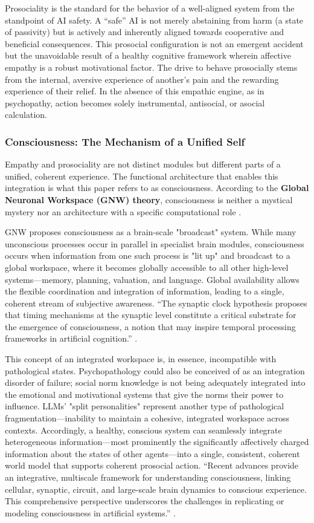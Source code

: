 \documentclass{article}
\begin{document}
Prosociality is the standard for the behavior of a well-aligned system from the standpoint of AI safety. A “safe” AI is not merely abstaining from harm (a state of passivity) but is actively and inherently aligned towards cooperative and beneficial consequences. This prosocial configuration is not an emergent accident but the unavoidable result of a healthy cognitive framework wherein affective empathy is a robust motivational factor. The drive to behave prosocially stems from the internal, aversive experience of another's pain and the rewarding experience of their relief. In the absence of this empathic engine, as in psychopathy, action becomes solely instrumental, antisocial, or asocial calculation.

\subsubsection{Consciousness: The Mechanism of a Unified Self}
Empathy and prosociality are not distinct modules but different parts of a unified, coherent experience. The functional architecture that enables this integration is what this paper refers to as consciousness. According to the \textbf{Global Neuronal Workspace (GNW) theory}, consciousness is neither a mystical mystery nor an architecture with a specific computational role \citep{ref12}.

GNW proposes consciousness as a brain-scale "broadcast" system. While many unconscious processes occur in parallel in specialist brain modules, consciousness occurs when information from one such process is "lit up" and broadcast to a global workspace, where it becomes globally accessible to all other high-level systems—memory, planning, valuation, and language. Global availability allows the flexible coordination and integration of information, leading to a single, coherent stream of subjective awareness. “The synaptic clock hypothesis proposes that timing mechanisms at the synaptic level constitute a critical substrate for the emergence of consciousness, a notion that may inspire temporal processing frameworks in artificial cognition.” \citep{ref8}.

This concept of an integrated workspace is, in essence, incompatible with pathological states. Psychopathology could also be conceived of as an integration disorder of failure; social norm knowledge is not being adequately integrated into the emotional and motivational systems that give the norms their power to influence. LLMs' "split personalities" represent another type of pathological fragmentation—inability to maintain a cohesive, integrated workspace across contexts. Accordingly, a healthy, conscious system can seamlessly integrate heterogeneous information—most prominently the significantly affectively charged information about the states of other agents—into a single, consistent, coherent world model that supports coherent prosocial action. “Recent advances provide an integrative, multiscale framework for understanding consciousness, linking cellular, synaptic, circuit, and large-scale brain dynamics to conscious experience. This comprehensive perspective underscores the challenges in replicating or modeling consciousness in artificial systems.” \citep{ref22}.
\end{document}

